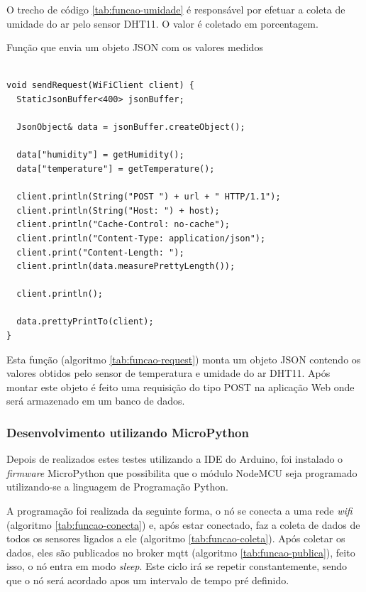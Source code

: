 O trecho de código \ref{tab:funcao-umidade} é responsável por efetuar a coleta de umidade do ar pelo sensor DHT11. O valor é coletado em porcentagem.

\begin{table}[H]
\centering
\caption{Função que envia um objeto JSON com os valores medidos}
\vspace{-\baselineskip}
\begin{verbatim}

void sendRequest(WiFiClient client) {
  StaticJsonBuffer<400> jsonBuffer;

  JsonObject& data = jsonBuffer.createObject();

  data["humidity"] = getHumidity();
  data["temperature"] = getTemperature();

  client.println(String("POST ") + url + " HTTP/1.1");
  client.println(String("Host: ") + host);
  client.println("Cache-Control: no-cache");
  client.println("Content-Type: application/json");
  client.print("Content-Length: ");
  client.println(data.measurePrettyLength());

  client.println();

  data.prettyPrintTo(client);
}
\end{verbatim}
\vspace{-1.2cm}
\label{tab:funcao-request}
\end{table}

Esta função (algoritmo \ref{tab:funcao-request}) monta um objeto JSON contendo os valores obtidos pelo sensor de temperatura e umidade do ar DHT11. Após montar este objeto é feito uma requisição do tipo POST na aplicação Web onde será armazenado em um banco de dados.

\subsubsection{Desenvolvimento utilizando MicroPython}

Depois de realizados estes testes utilizando a IDE do Arduino, foi instalado o \textit{firmware} MicroPython que possibilita que o módulo NodeMCU seja programado utilizando-se a linguagem de Programação Python.

A programação foi realizada da seguinte forma, o nó se conecta a uma rede \textit{wifi} (algoritmo \ref{tab:funcao-conecta}) e, após estar conectado, faz a coleta de dados de todos os sensores ligados a ele (algoritmo \ref{tab:funcao-coleta}). Após coletar os dados, eles são publicados no broker mqtt (algoritmo \ref{tab:funcao-publica}), feito isso, o nó entra em modo \textit{sleep}. Este ciclo irá se repetir constantemente, sendo que o nó será acordado apos um intervalo de tempo pré definido.

